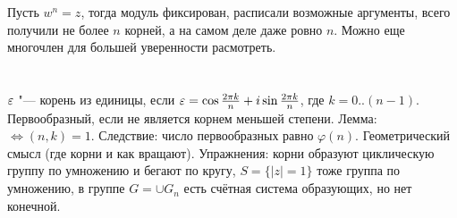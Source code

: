 \section{} %
Пусть $w^n = z$, тогда модуль фиксирован, расписали возможные аргументы, всего получили не более $n$ корней, а на самом деле даже ровно $n$.
Можно еще многочлен для большей уверенности расмотреть.

\section{} %
$\varepsilon$ "--- корень из единицы, если $\varepsilon = \cos\frac{2\pi k}{n} + i\sin\frac{2\pi k}{n}$, где $k=0..(n-1)$. Первообразный, если
не является корнем меньшей степени. Лемма: $\iff (n,k)=1$. Следствие: число первообразных равно $\varphi(n)$. Геометрический смысл
(где корни и как вращают). Упражнения: корни образуют циклическую группу по умножению и бегают по кругу, $S=\{|z|=1\}$ тоже группа по умножению, в группе $G=\cup G_n$
есть счётная система образующих, но нет конечной.

\section{} %
\TODO

\section{} %
\TODO

\section{} %
\TODO
